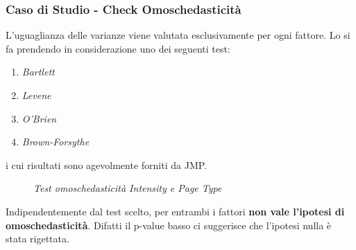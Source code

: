 \subsubsection{Caso di Studio - Check Omoschedasticità}
L'uguaglianza delle varianze viene valutata esclusivamente per ogni fattore. Lo si fa prendendo in considerazione uno dei seguenti test:
\begin{enumerate}
	\item \textit{Bartlett}
	\item \textit{Levene}
	\item \textit{O'Brien}
	\item \textit{Brown-Forsythe}
\end{enumerate}
i cui risultati sono agevolmente forniti da JMP.
\begin{figure}[H]
	\caption{\textit{Test omoschedasticità Intensity e Page Type}}
\end{figure}
Indipendentemente dal test scelto, per entrambi i fattori \textbf{non vale l'ipotesi di omoschedasticità}. Difatti il p-value basso ci suggerisce che l'ipotesi nulla è stata rigettata.
